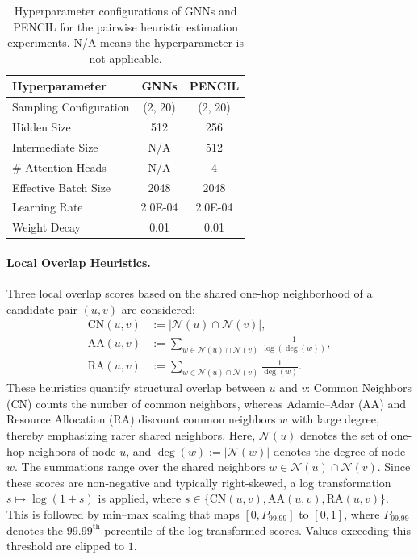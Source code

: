 \documentclass{article}
\theoremstyle{plain}
\theoremstyle{definition}
\theoremstyle{remark}
\begin{document}
\begin{table}[t]
    \centering
    \caption{Hyperparameter configurations of GNNs and PENCIL for the pairwise heuristic estimation experiments. N/A means the hyperparameter is not applicable.}
    \label{tab:hyperparameters}
    \begin{tabular}{@{}lcc@{}}
    \toprule
    Hyperparameter & GNNs & PENCIL \\
    \midrule
    Sampling Configuration & (2, 20) & (2, 20) \\
    Hidden Size & 512 & 256 \\
    Intermediate Size & N/A & 512 \\
    \# Attention Heads & N/A & 4 \\
    Effective Batch Size & 2048 & 2048 \\
    Learning Rate & 2.0E-04 & 2.0E-04 \\
    Weight Decay & 0.01 & 0.01 \\
    \bottomrule
    \end{tabular}
\end{table}



\paragraph{Local Overlap Heuristics.}
Three local overlap scores based on the shared one-hop neighborhood of a candidate pair \((u,v)\) are considered:
\begin{align}
\mathrm{CN}(u,v) &:= \big|\mathcal{N}(u)\cap \mathcal{N}(v)\big|, \\
\mathrm{AA}(u,v) &:= \sum_{w\in \mathcal{N}(u)\cap \mathcal{N}(v)} \frac{1}{\log(\deg(w))}, \\
\mathrm{RA}(u,v) &:= \sum_{w\in \mathcal{N}(u)\cap \mathcal{N}(v)} \frac{1}{\deg(w)}.
\end{align}
These heuristics quantify structural overlap between \(u\) and \(v\): Common Neighbors (CN) \cite{newman_clustering_2001} counts the number of common neighbors, whereas Adamic--Adar (AA) \cite{adamic_friends_2003} and Resource Allocation (RA) \cite{zhou_predicting_2009} discount common neighbors \(w\) with large degree, thereby emphasizing rarer shared neighbors. Here, \(\mathcal{N}(u)\) denotes the set of one-hop neighbors of node \(u\), and \(\deg(w):=|\mathcal{N}(w)|\) denotes the degree of node \(w\). The summations range over the shared neighbors \(w\in \mathcal{N}(u)\cap \mathcal{N}(v)\).
Since these scores are non-negative and typically right-skewed, a log transformation \(s \mapsto \log(1+s)\) is applied, where \(s\in\{\mathrm{CN}(u,v),\mathrm{AA}(u,v),\mathrm{RA}(u,v)\}\). This is followed by min--max scaling that maps \([0, P_{99.99}]\) to \([0,1]\), where \(P_{99.99}\) denotes the \(99.99^{\text{th}}\) percentile of the log-transformed scores. Values exceeding this threshold are clipped to \(1\).
\end{document}

